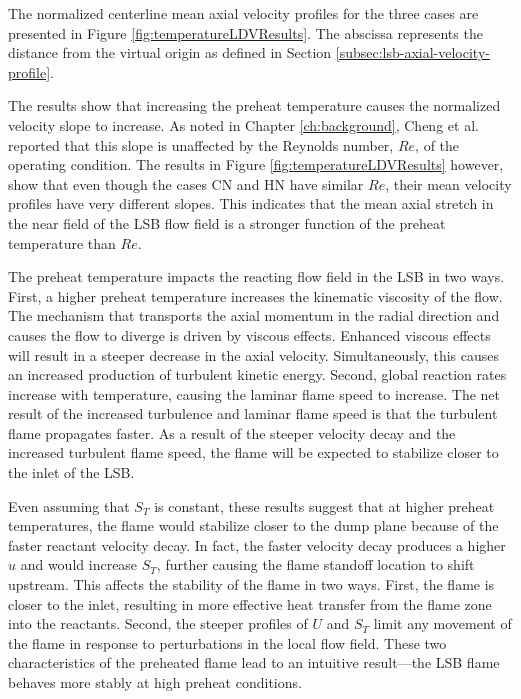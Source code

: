 

The normalized centerline mean axial velocity profiles for the three cases are presented in Figure \ref{fig:temperatureLDVResults}.
The abscissa represents the distance from the virtual origin as defined in Section \ref{subsec:lsb-axial-velocity-profile}.



The results show that increasing the preheat temperature causes the normalized velocity slope to increase.
As noted in Chapter \ref{ch:background}, Cheng et al.\cite{2008-cheng-a} reported that this slope is unaffected by the Reynolds number, \(Re\), of the operating condition.
The results in Figure \ref{fig:temperatureLDVResults} however, show that even though the cases CN and HN have similar \(Re\), their mean velocity profiles have very different slopes.
This indicates that the mean axial stretch in the near field of the LSB flow field is a stronger function of the preheat temperature than \(Re\).


The preheat temperature impacts the reacting flow field in the LSB in two ways.
First, a higher preheat temperature increases the kinematic viscosity of the flow.
The mechanism that transports the axial momentum in the radial direction and causes the flow to diverge is driven by viscous effects.
Enhanced viscous effects will result in a steeper decrease in the axial velocity.
Simultaneously, this causes an increased production of turbulent kinetic energy.
Second, global reaction rates increase with temperature, causing the laminar flame speed to increase.
The net result of the increased turbulence and laminar flame speed is that the turbulent flame propagates faster.
As a result of the steeper velocity decay and the increased turbulent flame speed, the flame will be expected to stabilize closer to the inlet of the LSB.

Even assuming that \(S_T\) is constant, these results suggest that at higher preheat temperatures, the flame would stabilize closer to the dump plane because of the faster reactant velocity decay.
In fact, the faster velocity decay produces a higher \(u\) and would increase \(S_T\), further causing the flame standoff location to shift upstream.
This affects the stability of the flame in two ways.
First, the flame is closer to the inlet, resulting in more effective heat transfer from the flame zone into the reactants.
Second, the steeper profiles of \(U\) and \(S_T\) limit any movement of the flame in response to perturbations in the local flow field.
These two characteristics of the preheated flame lead to an intuitive result---the LSB flame behaves more stably at high preheat conditions.

